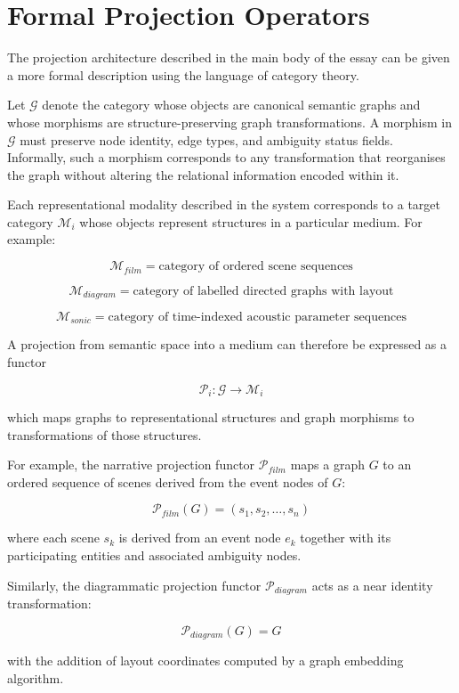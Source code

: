 \documentclass[12pt, a4paper]{article}
\begin{document}
\section{Formal Projection Operators}

The projection architecture described in the main body of the essay can be given a more formal description using the language of category theory.

Let $\mathcal{G}$ denote the category whose objects are canonical semantic graphs and whose morphisms are structure-preserving graph transformations. A morphism in $\mathcal{G}$ must preserve node identity, edge types, and ambiguity status fields. Informally, such a morphism corresponds to any transformation that reorganises the graph without altering the relational information encoded within it.

Each representational modality described in the system corresponds to a target category $\mathcal{M}_i$ whose objects represent structures in a particular medium. For example:

\[
\mathcal{M}_{film} = \text{category of ordered scene sequences}
\]

\[
\mathcal{M}_{diagram} = \text{category of labelled directed graphs with layout}
\]

\[
\mathcal{M}_{sonic} = \text{category of time-indexed acoustic parameter sequences}
\]

A projection from semantic space into a medium can therefore be expressed as a functor

\[
\mathcal{P}_i : \mathcal{G} \rightarrow \mathcal{M}_i
\]

which maps graphs to representational structures and graph morphisms to transformations of those structures.

For example, the narrative projection functor $\mathcal{P}_{film}$ maps a graph $G$ to an ordered sequence of scenes derived from the event nodes of $G$:

\[
\mathcal{P}_{film}(G) = (s_1, s_2, \dots, s_n)
\]

where each scene $s_k$ is derived from an event node $e_k$ together with its participating entities and associated ambiguity nodes.

Similarly, the diagrammatic projection functor $\mathcal{P}_{diagram}$ acts as a near identity transformation:

\[
\mathcal{P}_{diagram}(G) = G
\]

with the addition of layout coordinates computed by a graph embedding algorithm.
\end{document}
